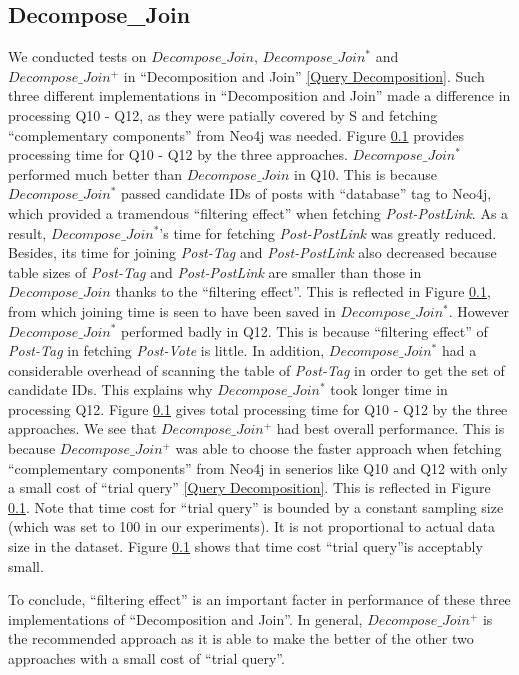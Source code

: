\subsection{Decompose\_Join}
We conducted tests on $Decompose\_Join$, $Decompose\_Join^{*}$ and $Decompose\_Join^{+}$ in ``Decomposition and Join'' \ref{Query Decomposition}. Such three different implementations in ``Decomposition and Join'' made a difference in processing Q10 - Q12, as they were patially covered by S and fetching ``complementary components'' from Neo4j was needed. Figure \ref{} provides processing time for Q10 - Q12 by the three approaches. $Decompose\_Join^{*}$ performed much better than $Decompose\_Join$ in Q10. This is because $Decompose\_Join^{*}$ passed candidate IDs of posts with ``database'' tag to Neo4j, which provided a tramendous ``filtering effect'' when fetching \textit{Post-PostLink}. As a result, $Decompose\_Join^{*}$'s time for fetching \textit{Post-PostLink} was greatly reduced. Besides, its time for joining \textit{Post-Tag} and \textit{Post-PostLink} also decreased because table sizes of \textit{Post-Tag} and \textit{Post-PostLink} are smaller than those in $Decompose\_Join$ thanks to the ``filtering effect''. This is reflected in Figure \ref{}, from which joining time is seen to have been saved in $Decompose\_Join^{*}$. However $Decompose\_Join^{*}$ performed badly in Q12. This is because ``filtering effect'' of \textit{Post-Tag} in fetching \textit{Post-Vote} is little. In addition, $Decompose\_Join^{*}$ had a considerable overhead of scanning the table of \textit{Post-Tag} in order to get the set of candidate IDs. This explains why $Decompose\_Join^{*}$ took longer time in processing Q12. Figure \ref{} gives total processing time for Q10 - Q12 by the three approaches. We see that $Decompose\_Join^{+}$ had best overall performance. This is because $Decompose\_Join^{+}$ was able to choose the faster approach when fetching ``complementary components'' from Neo4j in senerios like Q10 and Q12 with only a small cost of ``trial query'' \ref{Query Decomposition}. This is reflected in Figure \ref{}. Note that time cost for ``trial query'' is bounded by a constant sampling size (which was set to 100 in our experiments). It is not proportional to actual data size in the dataset. Figure \ref{} shows that time cost ``trial query''is acceptably small. 

To conclude, ``filtering effect'' is an important facter in performance of these three implementations of ``Decomposition and Join''. In general, $Decompose\_Join^{+}$ is the recommended approach as it is able to make the better of the other two approaches with a small cost of ``trial query''.


